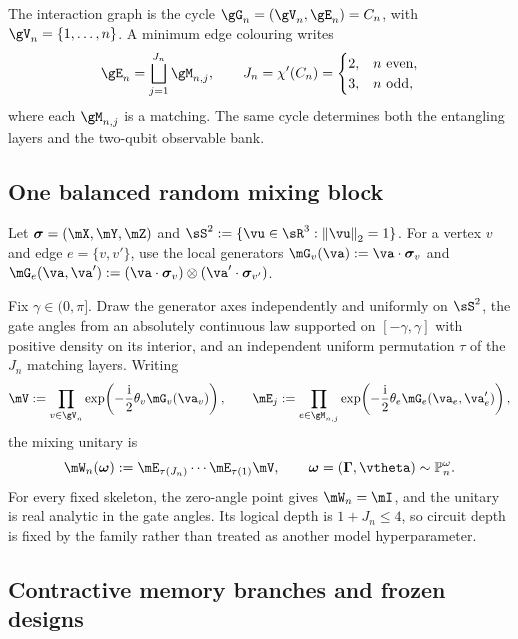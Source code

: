 The interaction graph is the cycle $\gG_n=(\gV_n,\gE_n)=C_n$, with
$\gV_n=\{1,\ldots,n\}$.  A minimum edge colouring writes
\[
    \gE_n=\bigsqcup_{j=1}^{J_n}\gM_{n,j},
    \qquad
    J_n=\chi'(C_n)=
    \begin{cases}
        2,&n\text{ even},\\
        3,&n\text{ odd},
    \end{cases}
\]
where each $\gM_{n,j}$ is a matching.  The same cycle determines both the
entangling layers and the two-qubit observable bank.

\subsection{One balanced random mixing block}
\label{sec:single-balanced-circuit}

Let $\pauliVec=(\pauliX,\pauliY,\pauliZ)$ and
$\sS^2:=\{\vu\in\sR^3:\norm{\vu}_2=1\}$.  For a vertex $v$ and edge
$e=\{v,v'\}$, use the local generators
$\mG_v(\va):=\va\cdot\pauliVec_v$ and
$\mG_e(\va,\va'):=(\va\cdot\pauliVec_v)\otimes
(\va'\cdot\pauliVec_{v'})$.

Fix $\gamma\in(0,\pi]$.  Draw the generator axes independently and uniformly
on $\sS^2$, the gate angles from an absolutely continuous law supported on
$[-\gamma,\gamma]$ with positive density on its interior, and an independent
uniform permutation $\tau$ of the $J_n$ matching layers.  Writing
\[
    \blockV:=\prod_{v\in\gV_n}
      \exp\!\left(-\frac{\ii}{2}\theta_v\mG_v(\va_v)\right),
    \qquad
    \blockE_j:=\prod_{e\in\gM_{n,j}}
      \exp\!\left(-\frac{\ii}{2}\theta_e\mG_e(\va_e,\va'_e)\right),
\]
the mixing unitary is
\begin{equation}
    \reservoirUnitary_n(\rpar)
    :=\blockE_{\tau(J_n)}\cdots\blockE_{\tau(1)}\blockV,
    \qquad \rpar=(\skeleton,\gateangles)\sim\mathbb P_n^\omega.
    \label{eq:balanced-circuit-definition}
\end{equation}
For every fixed skeleton, the zero-angle point gives
$\reservoirUnitary_n=\identity$, and the unitary is real analytic in the gate
angles.  Its logical depth is $1+J_n\leq4$, so circuit depth is fixed by the
family rather than treated as another model hyperparameter.

\subsection{Contractive memory branches and frozen designs}
\label{sec:memory-channels}

